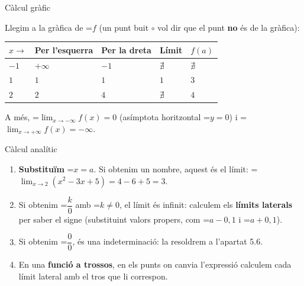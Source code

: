 \documentclass[11pt,a4paper]{article}
\newcommand{\fmm}[1]{\setbox0=\hbox{$#1$}\ifdim\wd0>\linewidth\fmdisp{#1}\else\mbox{\box0}\fi}
\newcommand{\fmdisp}[1]{\[\setbox2=\hbox{$\displaystyle #1$}\ifdim\wd2>\linewidth\resizebox{\linewidth}{!}{\box2}\else\box2\fi\]}
\begin{document}
\begin{fmex}{Càlcul gràfic}
\begin{center}\end{center}

Llegim a la gràfica de \fmm{f} (un punt buit $\circ$ vol dir que el punt \textbf{no} és de la gràfica):

\begin{center}\renewcommand{\arraystretch}{1.5}\small\begin{tabularx}{\linewidth}{>{\raggedright\arraybackslash}p{3.2cm}>{\raggedright\arraybackslash}X>{\raggedright\arraybackslash}X>{\raggedright\arraybackslash}X>{\raggedright\arraybackslash}X}\toprule
\textbf{$x\to$} & \textbf{Per l'esquerra} & \textbf{Per la dreta} & \textbf{Límit} & \textbf{$f(a)$}\\\midrule
$-1$ & $+\infty$ & $-1$ & $\nexists$ & $\nexists$\\[3pt]
$1$ & $1$ & $1$ & $1$ & $3$\\[3pt]
$2$ & $2$ & $4$ & $\nexists$ & $4$\\[3pt]
\bottomrule\end{tabularx}\end{center}

A més, \fmm{\displaystyle\lim_{x\to-\infty}f(x)=0} (asímptota horitzontal \fmm{y=0}) i \fmm{\displaystyle\lim_{x\to+\infty}f(x)=-\infty}.
\end{fmex}

\begin{fmdef}{Càlcul analític}
\begin{enumerate}
\item \textbf{Substituïm} \fmm{x=a}. Si obtenim un nombre, aquest és el límit: \fmm{\displaystyle\lim_{x\to2}\left(x^2-3x+5\right)=4-6+5=3}.
\item Si obtenim \fmm{\dfrac{k}{0}} amb \fmm{k\neq0}, el límit és infinit: calculem els \textbf{límits laterals} per saber el signe (substituint valors propers, com \fmm{a-0{,}1} i \fmm{a+0{,}1}).
\item Si obtenim \fmm{\dfrac00}, és una indeterminació: la resoldrem a l'apartat 5.6.
\item En una \textbf{funció a trossos}, en els punts on canvia l'expressió calculem cada límit lateral amb el tros que li correspon.
\end{enumerate}
\end{fmdef}
\end{document}

